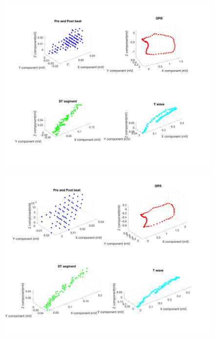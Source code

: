 \documentclass[12pt]{article}
\begin{document}
\begin{figure}[H]
	
	\centering
	\includegraphics[width = .95\textwidth]{Figures/BSP_run2_3d.png}
	\caption{ }
	\label{fig:BSP2}
\end{figure}

\begin{figure}[H]
	
	\centering
	\includegraphics[width = .95\textwidth]{Figures/BSP_run3_3d.png}
	\caption{ }
	\label{fig:BSP3}
\end{figure}
\end{document}
